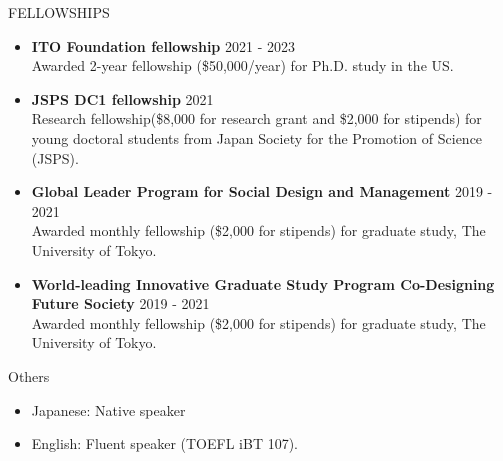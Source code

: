 \documentclass{resume} %
\begin{document}
\begin{rSection}{FELLOWSHIPS }
    \begin{itemize}
    \item \textbf{ITO Foundation fellowship} \hfill    2021 - 2023 \\
    Awarded 2-year fellowship (\$50,000/year) for Ph.D. study in the US. 


    \item \textbf{JSPS DC1 fellowship} \hfill   2021 \\
    Research fellowship(\$8,000 for research grant and \$2,000 for stipends) for young doctoral students from Japan Society for the Promotion of Science (JSPS).

    \item \textbf{Global Leader Program for Social Design and Management} \hfill 2019 - 2021\\
    Awarded monthly fellowship (\$2,000 for stipends) for graduate study, The University of Tokyo.

    \item \textbf{World-leading Innovative Graduate Study Program Co-Designing Future Society} \hfill 2019 - 2021\\
    Awarded monthly fellowship (\$2,000 for stipends) for graduate study, The University of Tokyo.
    
    \end{itemize}
\end{rSection}

\begin{rSection}{Others}
    \begin{itemize}
    \item Japanese: Native speaker
    \item English: Fluent speaker (TOEFL iBT 107).
    \end{itemize}
\end{rSection}
\end{document}
